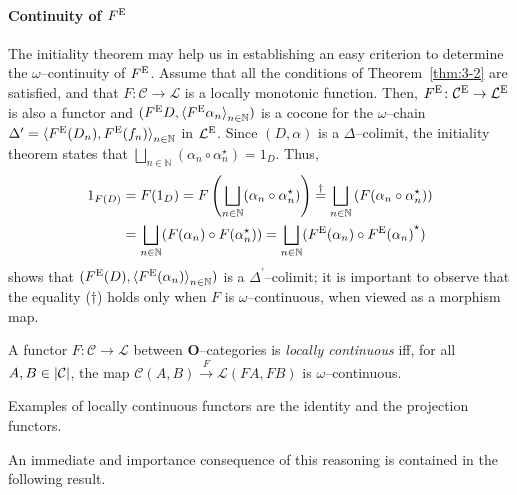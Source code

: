 \paragraph{Continuity of \(F^\textup{E}\)}
The initiality theorem may help us in establishing an easy criterion to determine the \(\omega\)--continuity of \(F^\textup{E}\). %
Assume that all the conditions of Theorem~\ref{thm:3-2} are satisfied, and that \(F \colon \mathcal{C} \to \mathcal{L}\) is a locally monotonic function.
Then, \(F^\textup{E} \colon \mathcal{C}^\textup{E} \to \mathcal{L}^\textup{E}\) is also a functor and \((F^\textup{E}D, {\langle F^\textup{E}\alpha_n\rangle}_{n \in \mathbb{N}})\) is a cocone for the \(\omega\)--chain %
\(\Delta^\prime = {\langle F^\textup{E}(D_n), F^\textup{E}(f_n)\rangle}_{n \in \mathbb{N}}\) in \(\mathcal{L}^\textup{E}\).
Since \((D,\alpha)\) is a \(\Delta\)--colimit, the initiality theorem states that \(\bigsqcup_{n \in \mathbb{N}}(\alpha_n \circ \alpha_n^\star) = 1_D\). %
Thus,
\begin{equation*}
  \begin{split}
    1_{F(D)} &= F(1_D) = F\left(\bigsqcup_{n \in \mathbb{N}}(\alpha_n \circ \alpha_n^\star)\right) \overset{\dagger}{=} \bigsqcup_{n \in \mathbb{N}}\left(F(\alpha_n \circ \alpha_n^\star)\right) \\ &= \bigsqcup_{n \in \mathbb{N}}(F(\alpha_n) \circ F(\alpha_n^\star))
    = \bigsqcup_{n \in \mathbb{N}}(F^\textup{E}(\alpha_n) \circ {F^\textup{E}(\alpha_n)}^\star)
  \end{split}
\end{equation*}
shows that \((F^\textup{E}(D), {\langle F^\textup{E}(\alpha_n)\rangle}_{n \in \mathbb{N}})\) is a \(\Delta^\prime\)--colimit; %
it is important to observe that the equality (\(\dagger{}\)) holds only when \(F\) is \(\omega\)--continuous, when viewed as a morphism map. %

\begin{dfn}
  A functor \(F \colon \mathcal{C} \to \mathcal{L}\) between \(\mathbf{O}\)--categories is \emph{locally continuous} iff, for all \(A, B \in \lvert \mathcal{C} \rvert\), the map \(\mathcal{C}(A,B) \overset{F}{\to}\mathcal{L}(FA,FB)\) is \(\omega{}\)--continuous.
\end{dfn}

Examples of locally continuous functors are the identity and the projection functors.

An immediate and importance consequence of this reasoning is contained in the following result.

